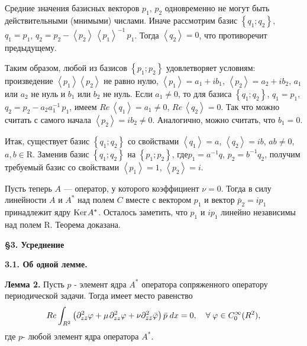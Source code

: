 Средние значения базисных векторов $p_{1} $, $p_{2} $ одновременно не могут быть действительными (мнимыми) числами. Иначе рассмотрим базис $\left\{q_{1} ;q_{2} \right\}$, $q_{1} =p_{1} $,  $q_{2} =p_{2} -\left\langle p_{2} \right\rangle \, \left\langle p_{1} \right\rangle ^{-1} \, p_{1} $. Тогда $\left\langle q_{2} \right\rangle =0$, что противоречит предыдущему.

Таким образом, любой из базисов $\left\{p_{1} ;p_{2} \right\}$ удовлетворяет условиям: произведение  $\left\langle p_{1} \right\rangle $$\left\langle p_{2} \right\rangle $ не равно нулю, $\left\langle p_{1} \right\rangle =a_{1} +ib_{1} $, $\left\langle p_{2} \right\rangle =a_{2} +ib_{2} $, $a_{1} $ или $a_{2} $ не нуль и $b_{1} $ или $b_{2} $ не нуль. Если $a_{1} \ne 0$, то для базиса $\left\{q_{1} ;q_{2} \right\}$, $q_{1} =p_{1} $, $q_{2} =p_{2} -a_{2} a_{1} ^{-1} \, p_{1} $, имеем $Re\, \left\langle q_{1} \right\rangle =a_{1} \ne 0$, $Re\, \left\langle q_{2} \right\rangle =0$. Так что можно считать с самого начала $\left\langle p_{2} \right\rangle =ib_{2} \ne 0$. Аналогично, можно считать,  что $b_{1} =0$.

Итак, существует базис $\left\{q_{1} ;q_{2} \right\}$ со свойствами $\left\langle q_{1} \right\rangle =a$, $\left\langle q_{2} \right\rangle =ib$, $ab\ne 0$, $a,b\in \mathrm{ R}$. Заменив базис $\left\{q_{1} ;q_{2} \right\}$ на $\left\{p_{1} ;p_{2} \right\}$, где$p_{1} =a^{-1} q$,  $p_{2} =b^{-1} q_{2} $, получим требуемый базис со свойствами $\left\langle p_{1} \right\rangle =1$, $\left\langle p_{2} \right\rangle =i$.

Пусть теперь $A$ --- оператор, у которого коэффициент $\nu =0$. Тогда в силу линейности $A$ и $A^{*} $ над полем $C$ вместе с вектором $p_{1} $ и вектор $\bar{p}_{2} =ip_{1} $ принадлежит ядру $\mathrm{ Ker}{\kern 1pt} A^{*} $. Осталось заметить, что $p_{1} $ и $ip_{1} $ линейно независимы над полем $\mathrm{ R}$. Теорема доказана.

\textbf{}

\textbf{\S 3. Усреднение }

\textbf{3.1. Об одной лемме. }

\textbf{Лемма 2. }Пусть $p$ - элемент ядра $A^{*} $ оператора сопряженного оператору периодической задачи. Тогда имеет место равенство
\begin{equation}
\label{sirM2.17_}
Re\int _{R^{2} }\left(\partial _{z\bar{z}}^{2} \varphi +\mu {\kern 1pt} \partial _{zz}^{2} \varphi +\nu \partial _{\bar{z}\bar{z}}^{2} \bar{\varphi }\right)\bar{p}\, {\kern 1pt} dx =0, \quad \forall \; \varphi \in C_{0}^{\infty } (R^{2} ),
\end{equation}
где  $p$- любой элемент ядра оператора $A^{*}$.

